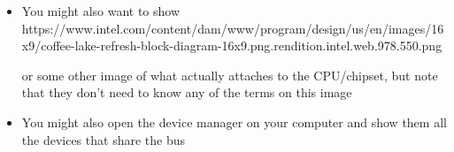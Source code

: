 


\begin{frame}[fragile]
\BNotes\ifnum{}
\begin{itemize}
\item You might also want to show
  https://www.intel.com/content/dam/www/program/design/us/en/images/16x9/coffee-lake-refresh-block-diagram-16x9.png.rendition.intel.web.978.550.png

  or some other image of what actually attaches to the CPU/chipset,
  but note that they don't need to know any of the terms on this image
  \item You might also open the device manager on your computer and show them all the devices that share the bus
  \end{itemize}
\fi\ENotes
\end{frame}

